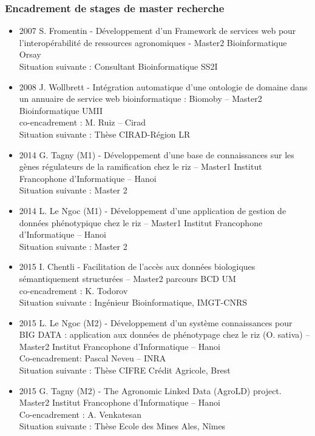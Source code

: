 \subsubsection*{Encadrement de stages de master recherche}

\begin{itemize}
\item 2007 S. Fromentin - Développement d’un Framework de services web pour l’interopérabilité de ressources agronomiques - Master2 Bioinformatique Orsay\\
Situation suivante : Consultant Bioinformatique SS2I

\item 2008 J. Wollbrett - Intégration automatique d’une ontologie de domaine dans un annuaire de service web bioinformatique : Biomoby – Master2 Bioinformatique UMII\\
co-encadrement : M. Ruiz – Cirad\\
Situation suivante : Thèse CIRAD-Région LR

\item 2014 G. Tagny (M1) - Développement d’une base de connaissances sur les gènes régulateurs de la ramification chez le riz – Master1 Institut Francophone d’Informatique – Hanoi \\
Situation suivante : Master 2

\item 2014 L. Le Ngoc (M1) - Développement d’une application de gestion de données phénotypique chez le riz – Master1 Institut Francophone d’Informatique – Hanoi \\
Situation suivante : Master 2

\item 2015 I. Chentli - Facilitation de l'accès aux données biologiques sémantiquement structurées – Master2 parcours BCD UM \\
co-encadrement : K. Todorov \\
Situation suivante : Ingénieur Bioinformatique, IMGT-CNRS

\item 2015 L. Le Ngoc (M2) - Développement d’un système connaissances pour BIG DATA : application aux données de phénotypage chez le riz (O. sativa) – Master2 Institut Francophone d’Informatique – Hanoi \\
Co-encadrement: 	Pascal Neveu – INRA \\
Situation suivante : Thèse CIFRE Crédit Agricole, Brest

\item 2015 G. Tagny (M2) - The Agronomic Linked Data (AgroLD) project. Master2 Institut Francophone d’Informatique – Hanoi \\
Co-encadrement : A. Venkatesan \\
Situation suivante : Thèse Ecole des Mines Ales, Nîmes


\end{itemize}
